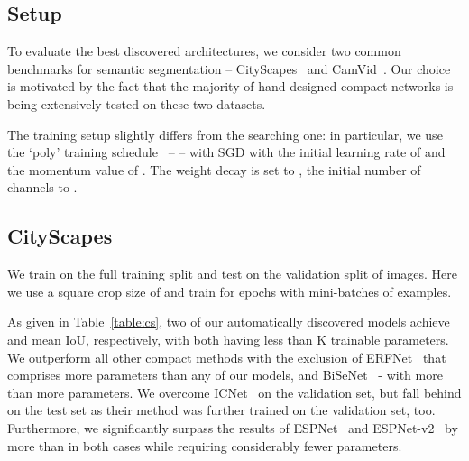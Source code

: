 \documentclass[10pt,twocolumn,letterpaper]{article}
\begin{document}
\subsection{Setup}

To evaluate the best discovered architectures, we consider two common benchmarks for semantic segmentation -- CityScapes~\cite{CordtsORREBFRS16} and CamVid~\cite{BrostowFC09}. Our choice is motivated by the fact that the majority of hand-designed compact networks is being extensively tested on these two datasets.

The training setup slightly differs from the searching one: in particular, we use the `poly' training schedule~\cite{ChenPKMY18} --  -- with SGD with the initial learning rate of  and the momentum value of . The weight decay is set to , the initial number of channels to .



\subsection{CityScapes}
We train on the full training split and test on the validation split of  images. Here we use a square crop size of  and train for  epochs with mini-batches of  examples.

As given in Table~\ref{table:cs}, two of our automatically discovered models achieve  and  mean IoU, respectively, with both having less than K trainable parameters. We outperform all other compact methods with the exclusion of ERFNet~\cite{RomeraABA18} that comprises  more parameters than any of our models, and BiSeNet~\cite{YuWPGYS18} - with more than  more parameters. We overcome ICNet~\cite{ZhaoQSSJ18} on the validation set, but fall behind on the test set as their method was further trained on the validation set, too. Furthermore, we significantly surpass the results of ESPNet~\cite{MehtaRCSH18} and ESPNet{-}v2~\cite{abs-1811-11431} by more than  in both cases while requiring considerably fewer parameters.
\end{document}

